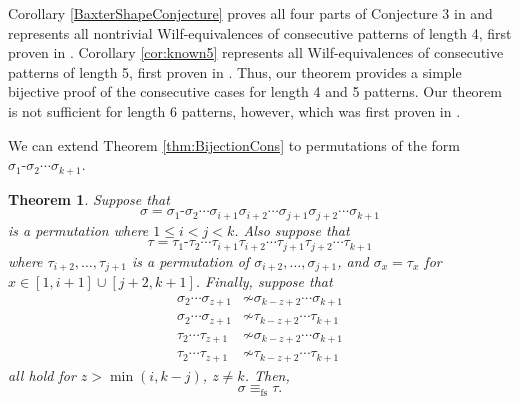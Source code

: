 \documentclass[11pt]{amsart}
\newtheorem{theorem}{Theorem}[section]
\theoremstyle{definition}
\begin{document}
Corollary \ref{BaxterShapeConjecture} proves all four parts of Conjecture $3$ in \cite{Baxter2013} and represents all nontrivial Wilf-equivalences of consecutive patterns of length 4, first proven in \cite{ElizaldeNoy2003}.  Corollary \ref{cor:known5} represents all Wilf-equivalences of consecutive patterns of length 5, first proven in \cite{Nakamura2011}.  Thus, our theorem provides a simple bijective proof of the consecutive cases for length 4 and 5 patterns. Our theorem is not sufficient for length 6 patterns, however, which was first proven in \cite{ElizaldeNoy2012}.

We can extend Theorem \ref{thm:BijectionCons} to
permutations of the form $\sigma_1 {\text{-}} \sigma_2 \cdots \sigma_{k+1}$.

\begin{theorem}  \label{thm:BijectionVinc}
    Suppose that 
	\[ \sigma = \sigma_1 {\text{-}} \sigma_2\cdots\sigma_{i+1}
		\sigma_{i+2}\cdots\sigma_{j+1}
		\sigma_{j+2}\cdots\sigma_{k+1}\]
	is a permutation where $1 \le i < j < k$.
	Also suppose that 
	\[ \tau = \tau_1 {\text{-}} \tau_2\cdots
		\tau_{i+1}\tau_{i+2}\cdots\tau_{j+1}\tau_{j+2}\cdots\tau_{k+1} \]
	where $\tau_{i+2}, \dots, \tau_{j+1}$ is a permutation of
	$\sigma_{i+2}, \dots, \sigma_{j+1}$, and $\sigma_x = \tau_x$
	for $x \in [1,i+1] \cup [j+2, k+1]$.
	Finally, suppose that
		\begin{align*}
		\sigma_2\cdots\sigma_{z+1} &\not\sim \sigma_{k-z+2}\cdots\sigma_{k+1} \\
		\sigma_2\cdots\sigma_{z+1} &\not\sim \tau_{k-z+2}\cdots\tau_{k+1} \\
		\tau_2\cdots\tau_{z+1} &\not\sim \sigma_{k-z+2}\cdots\sigma_{k+1} \\
		\tau_2\cdots\tau_{z+1} &\not\sim \tau_{k-z+2}\cdots\tau_{k+1}
	\end{align*}
	all hold for $z > \min(i, k-j)$, $z \neq  k$.
	Then, \[ \sigma \equiv_{\mathrm{fs}} \tau.\]
\end{theorem}
\end{document}
